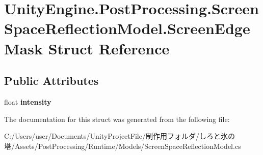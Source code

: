 \hypertarget{struct_unity_engine_1_1_post_processing_1_1_screen_space_reflection_model_1_1_screen_edge_mask}{}\section{Unity\+Engine.\+Post\+Processing.\+Screen\+Space\+Reflection\+Model.\+Screen\+Edge\+Mask Struct Reference}
\label{struct_unity_engine_1_1_post_processing_1_1_screen_space_reflection_model_1_1_screen_edge_mask}
\subsection*{Public Attributes}
\begin{DoxyCompactItemize}
\item 
\mbox{\label{struct_unity_engine_1_1_post_processing_1_1_screen_space_reflection_model_1_1_screen_edge_mask_a2b7c55a5cf534281a9e4acd398ecf805}} 
float {\bfseries intensity}
\end{DoxyCompactItemize}


The documentation for this struct was generated from the following file\+:\begin{DoxyCompactItemize}
\item 
C\+:/\+Users/user/\+Documents/\+Unity\+Project\+File/制作用フォルダ/しろと氷の塔/\+Assets/\+Post\+Processing/\+Runtime/\+Models/Screen\+Space\+Reflection\+Model.\+cs\end{DoxyCompactItemize}
